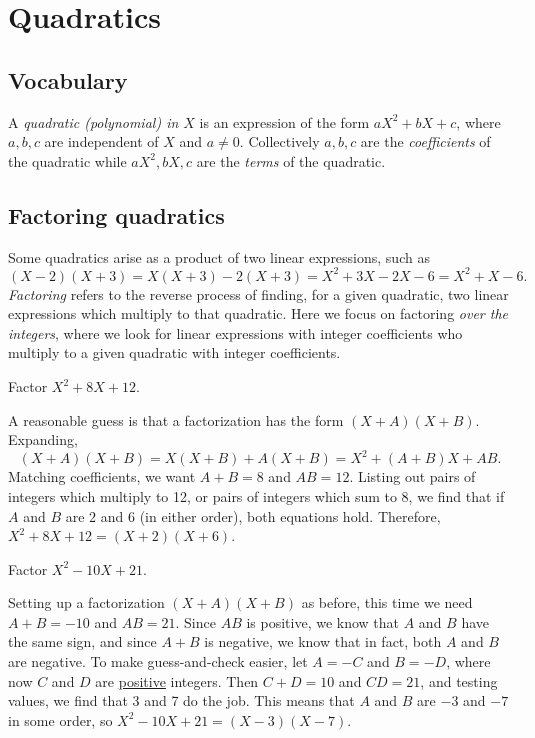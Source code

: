 \section{Quadratics}

\subsection{Vocabulary}

A \emph{quadratic (polynomial) in $X$} is an expression of the form $aX^2 + bX + c$, where $a,b,c$ are independent of $X$ and $a\neq 0$. Collectively $a,b,c$ are the \emph{coefficients} of the quadratic while $aX^2, bX, c$ are the \emph{terms} of the quadratic.

\subsection{Factoring quadratics}

Some quadratics arise as a product of two linear expressions, such as
\begin{equation*}
(X - 2)(X + 3) = X(X + 3) - 2(X + 3) = X^2 + 3X - 2X - 6 = X^2 + X - 6. 
\end{equation*}
\emph{Factoring} refers to the reverse process of finding, for a given quadratic, two linear expressions which multiply to that quadratic. Here we focus on factoring \emph{over the integers}, where we look for linear expressions with integer coefficients who multiply to a given quadratic with integer coefficients.

\begin{example}
Factor $X^2 + 8X + 12$.
\end{example}
\begin{solution}
A reasonable guess is that a factorization has the form $(X + A)(X + B)$. Expanding,
\begin{equation*}
(X + A)(X + B) = X(X + B) + A(X + B) = X^2 + (A + B)X + AB.
\end{equation*}
Matching coefficients, we want $A + B = 8$ and $AB = 12$. Listing out pairs of integers which multiply to 12, or pairs of integers which sum to 8, we find that if $A$ and $B$ are $2$ and $6$ (in either order), both equations hold. Therefore, $X^2 + 8X + 12 = \boxed{(X + 2)(X + 6)}$.
\end{solution}

\begin{example}
Factor $X^2 - 10X + 21$.
\end{example}
\begin{solution}
Setting up a factorization $(X + A)(X + B)$ as before, this time we need $A + B = -10$ and $AB = 21$. Since $AB$ is positive, we know that $A$ and $B$ have the same sign, and since $A + B$ is negative, we know that in fact, both $A$ and $B$ are negative. To make guess-and-check easier, let $A = -C$ and $B = -D$, where now $C$ and $D$ are \underline{positive} integers. Then $C + D = 10$ and $CD = 21$, and testing values, we find that 3 and 7 do the job. This means that $A$ and $B$ are $-3$ and $-7$ in some order, so $X^2 - 10X + 21 = \boxed{(X - 3)(X - 7)}$.
\end{solution}

